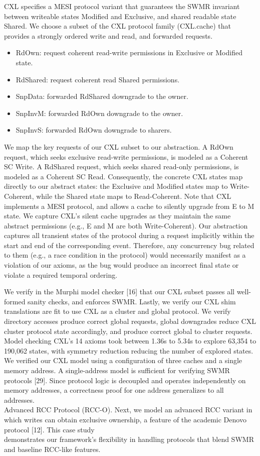 \documentclass[10pt]{article}
\begin{document}
CXL specifies a MESI protocol variant that guarantees the SWMR invariant between writeable states Modified and Exclusive, and shared readable state Shared. We choose a subset of the CXL protocol family (CXL.cache) that provides a strongly ordered write and read, and forwarded requests.

\begin{itemize}
  \item[-] RdOwn: request coherent read-write permissions in Exclusive or Modified state.
  \item[-] RdShared: request coherent read Shared permissions.
  \item[-] SnpData: forwarded RdShared downgrade to the owner.
  \item[-] SnpInvM: forwarded RdOwn downgrade to the owner.
  \item[-] SnpInvS: forwarded RdOwn downgrade to sharers.
\end{itemize}

We map the key requests of our CXL subset to our abstraction. A RdOwn request, which seeks exclusive read-write permissions, is modeled as a Coherent SC Write. A RdShared request, which seeks shared read-only permissions, is modeled as a Coherent SC Read. Consequently, the concrete CXL states map directly to our abstract states: the Exclusive and Modified states map to Write-Coherent, while the Shared state maps to Read-Coherent. Note that CXL implements a MESI protocol, and allows a cache to silently upgrade from E to M state. We capture CXL's silent cache upgrades as they maintain the same abstract permissions (e.g., E and M are both Write-Coherent). Our abstraction captures all transient states of the protocol during a request implicitly within the start and end of the corresponding event. Therefore, any concurrency bug related to them (e.g., a race condition in the protocol) would necessarily manifest as a violation of our axioms, as the bug would produce an incorrect final state or violate a required temporal ordering.

We verify in the Murphi model checker [16] that our CXL subset passes all well-formed sanity checks, and enforces SWMR. Lastly, we verify our CXL shim translations are fit to use CXL as a cluster and global protocol. We verify directory accesses produce correct global requests, global downgrades reduce CXL cluster protocol state accordingly, and produce correct global to cluster requests. Model checking CXL's 14 axioms took between 1.36s to 5.34s to explore 63,354 to 190,062 states, with symmetry reduction reducing the number of explored states. We verified our CXL model using a configuration of three caches and a single memory address. A single-address model is sufficient for verifying SWMR protocols [29]. Since protocol logic is decoupled and operates independently on memory addresses, a correctness proof for one address generalizes to all addresses.\\[0pt]
Advanced RCC Protocol (RCC-O). Next, we model an advanced RCC variant in which writes can obtain exclusive ownership, a feature of the academic Denovo protocol [12]. This case study\\
demonstrates our framework's flexibility in handling protocols that blend SWMR and baseline RCC-like features.
\end{document}
